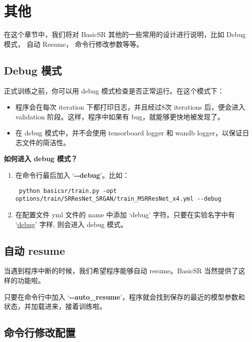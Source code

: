 \documentclass[../main.tex]{subfiles}
\begin{document}
\chapter{其他}
\vspace{-2cm}

在这个章节中，我们将对 BasicSR 其他的一些常用的设计进行说明，比如 Debug 模式， 自动 Resume， 命令行修改参数等等。

\section{Debug 模式}\label{others:debug_mode}

正式训练之前，你可以用 debug 模式检查是否正常运行。在这个模式下：
\begin{itemize}
	\item 程序会在每次 iteration 下都打印日志，并且经过8次 iterations 后，便会进入 validation 阶段。这样，程序中如果有 bug，就能够更快地被发现了。
	\item 在 debug 模式中，并不会使用 tensorboard logger 和 wandb logger，以保证日志文件的简洁性。
\end{itemize}

\textbf{如何进入 debug 模式？}

\begin{enumerate}[方式 1.]
	\item 在命令行最后加入 ‘\textbf{-{}-debug}’。比如：
	\begin{verbatim}
 python basicsr/train.py -opt options/train/SRResNet_SRGAN/train_MSRResNet_x4.yml --debug
	\end{verbatim}
	\item 在配置文件 yml 文件的 name 中添加 ‘debug’ 字符。只要在实验名字中有 ‘\uline{debug}’ 字样, 则会进入 debug 模式。
\end{enumerate}

\section{自动 resume}\label{others:auto_resume}

当遇到程序中断的时候，我们希望程序能够自动 resume。BasicSR 当然提供了这样的功能啦。

只要在命令行中加入 ‘\textbf{-{}-auto\_resume}’，程序就会找到保存的最近的模型参数和状态，并加载进来，接着训练啦。

\section{命令行修改配置}
\end{document}
